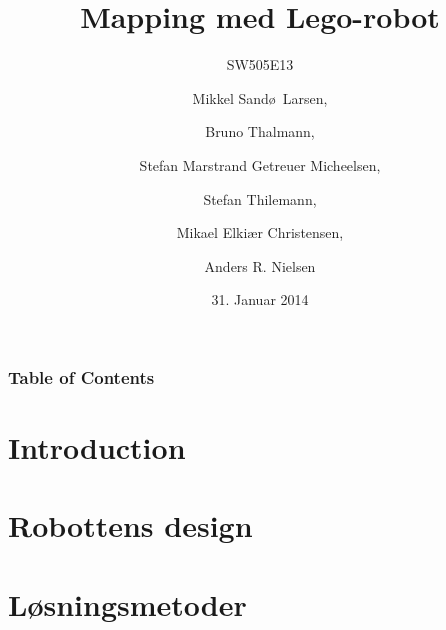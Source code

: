 \documentclass{beamer}
\title[Mapping med Lego-robot]{Mapping med Lego-robot}
\subtitle{SW505E13}
\author[SW505E13]{Mikkel Sand\o ~Larsen, \and Bruno Thalmann, \and Stefan Marstrand Getreuer Micheelsen, \and Stefan Thilemann, \and Mikael Elki\ae r Christensen, \and Anders R. Nielsen}
\institute[Aalborg University]
{
  Department of Computer Science\\
  Aalborg University}
\date[CFP 2003]{31. Januar 2014}
\begin{document}

\begin{frame}
  \titlepage
\end{frame}

\begin{frame}
    \frametitle{Table of Contents}
    \tableofcontents[sectionstyle=show/show,subsectionstyle=hide/hide/hide]
\end{frame}

\section{Introduction}





\section{Robottens design}


\section{Løsningsmetoder}

\end{document}

